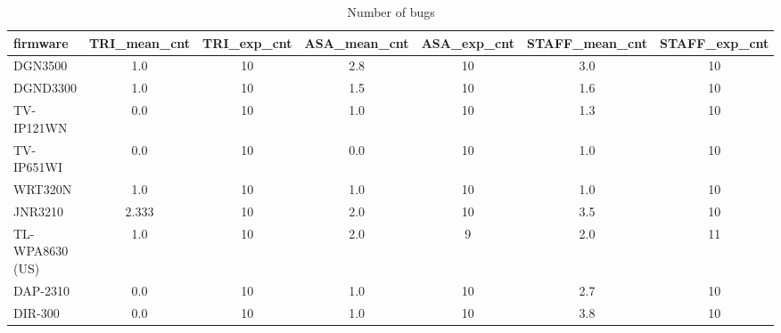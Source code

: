\begin{table}[ht]
\centering
\renewcommand{\arraystretch}{1.06}
\setlength{\tabcolsep}{4pt}
\begin{tabular}{|l||c|c|c|c|c|c|}
\hline
{\sc firmware} & {\sc TRI\_mean\_cnt} & {\sc TRI\_exp\_cnt} & {\sc ASA\_mean\_cnt} & {\sc ASA\_exp\_cnt} & {\sc STAFF\_mean\_cnt} & {\sc STAFF\_exp\_cnt} \\
\toprule
\hline
DGN3500 & 1.0 & 10 & 2.8 & 10 & 3.0 & 10 \\
\hline
DGND3300 & 1.0 & 10 & 1.5 & 10 & 1.6 & 10 \\
\hline
TV-IP121WN & 0.0 & 10 & 1.0 & 10 & 1.3 & 10 \\
\hline
TV-IP651WI & 0.0 & 10 & 0.0 & 10 & 1.0 & 10 \\
\hline
WRT320N & 1.0 & 10 & 1.0 & 10 & 1.0 & 10 \\
\hline
JNR3210 & 2.333 & 10 & 2.0 & 10 & 3.5 & 10 \\
\hline
TL-WPA8630 (US) & 1.0 & 10 & 2.0 & 9 & 2.0 & 11 \\
\hline
DAP-2310 & 0.0 & 10 & 1.0 & 10 & 2.7 & 10 \\
\hline
DIR-300 & 0.0 & 10 & 1.0 & 10 & 3.8 & 10 \\
\hline
\end{tabular}
\caption{Number of bugs}
\end{table}
